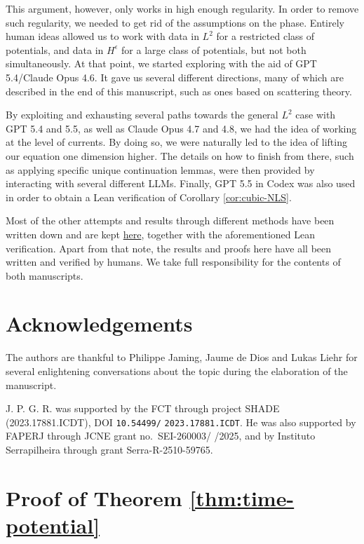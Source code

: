 \documentclass[11pt]{amsart}
\theoremstyle{remark}
\newcommand{\1}{\mathbf 1}
\begin{document}
This argument, however, only works in high enough regularity. In order to remove such regularity, we needed to get rid of the assumptions on the phase. Entirely human ideas allowed us to work with data in $L^2$ for a restricted class of potentials, and data in $H^{\epsilon}$ for a large class of potentials, but not both simultaneously.  At that point, we started exploring with the aid of GPT 5.4/Claude Opus 4.6. It gave us several different directions, many of which are described in the end of this manuscript, such as ones based on scattering theory. 

By exploiting and exhausting several paths towards the general $L^2$ case with GPT 5.4 and 5.5, as well as Claude Opus 4.7 and 4.8, we had the idea of working at the level of currents. By doing so, we were naturally led to the idea of lifting our equation one dimension higher. The details on how to finish from there, such as applying specific unique continuation lemmas, were then provided by interacting with several different LLMs. Finally, GPT 5.5 in Codex was also used in order to obtain a Lean verification of Corollary \ref{cor:cubic-NLS}.

Most of the other attempts and results through different methods have been written down and are kept \href{https://github.com/joaopgramos95/Schrodinger-PR/tree/main}{here}, together with the aforementioned Lean verification. Apart from that note, the results and proofs here have all been written and verified by humans. We take full responsibility for the contents of both manuscripts. 

\section*{Acknowledgements}

The authors are thankful to Philippe Jaming, Jaume de Dios and Lukas Liehr for several enlightening conversations about the topic during the elaboration of the manuscript. 

J. P. G. R.  was supported by the FCT through project SHADE
(2023.17881.ICDT), DOI \allowbreak \texttt{10.54499/}
\texttt{2023.17881.ICDT}. He was also supported  by FAPERJ through  JCNE grant
no.~SEI-260003/ /2025, and by Instituto Serrapilheira through
grant Serra-R-2510-59765.

\section{Proof of Theorem \ref{thm:time-potential}}
\end{document}
